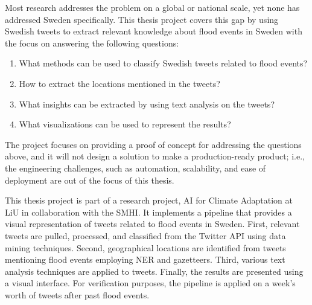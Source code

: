 Most research addresses the problem on a global or national scale, yet none has addressed Sweden
specifically. This thesis project covers this gap by using Swedish tweets to extract relevant
knowledge about flood events in Sweden with the focus on answering the following questions:
\begin{enumerate} 
  \item What methods can be used to classify Swedish tweets related to flood events?
  \item How to extract the locations mentioned in the tweets? 
  \item What insights can be extracted by using text analysis on the tweets?
  \item What visualizations can be used to represent the results? 
\end{enumerate}

The project focuses on providing a proof of concept for addressing the questions above, and it will
not design a solution to make a production-ready product; i.e., the engineering challenges, such as
automation, scalability, and ease of deployment are out of the focus of this thesis. 

This thesis project is part of a research project, AI for Climate Adaptation
\cite{nesetAI4ClimateAdaptation} at \ac{LiU} in collaboration with the \ac{SMHI}. It implements a
pipeline that provides a visual representation of tweets related to flood events in Sweden. First,
relevant tweets are pulled, processed, and classified from the Twitter API using data mining
techniques. Second, geographical locations are identified from tweets mentioning flood events employing
\ac{NER} and gazetteers. Third, various text analysis techniques are applied to tweets. Finally, the
results are presented using a visual interface. For verification purposes, the pipeline is applied
on a week's worth of tweets after past flood events.

